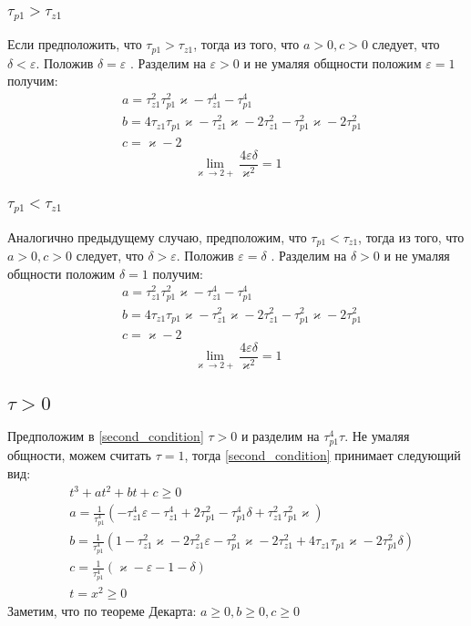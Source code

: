 \documentclass[a4paper]{article}
\begin{document}
\subsubsection{$\tau_{p1} > \tau_{z1}$}
Если предположить, что $\tau_{p1} > \tau_{z1}$, тогда из того, что $a > 0, c > 0$ следует, что $\delta < \varepsilon$. Положив $\delta = \varepsilon$ . Разделим на $\varepsilon > 0$ и не умаляя общности положим $\varepsilon = 1$ получим:
 \begin{equation}
 \begin{aligned}
&a = \tau_{z1}^2\tau_{p1}^2\varkappa - \tau_{z1}^4 - \tau_{p1}^4\\
&b = 4\tau_{z1}\tau_{p1}\varkappa - \tau_{z1}^2\varkappa - 2\tau_{z1}^2 - \tau_{p1}^2\varkappa - 2\tau_{p1}^2\\
&c = \varkappa-2
 \end{aligned}
\end{equation}
$$\lim_{\varkappa \to 2+} \frac{4\varepsilon\delta}{\varkappa^2} = 1$$
\subsubsection{$\tau_{p1} < \tau_{z1}$}
Аналогично предыдущему случаю, предположим, что $\tau_{p1} < \tau_{z1}$, тогда из того, что $a > 0, c > 0$ следует, что $\delta > \varepsilon$. Положив $\varepsilon = \delta$ . Разделим на $\delta > 0$ и не умаляя общности положим $\delta = 1$ получим:
 \begin{equation}
 \begin{aligned}
&a = \tau_{z1}^2\tau_{p1}^2\varkappa - \tau_{z1}^4 - \tau_{p1}^4\\
&b = 4\tau_{z1}\tau_{p1}\varkappa - \tau_{z1}^2\varkappa - 2\tau_{z1}^2 - \tau_{p1}^2\varkappa - 2\tau_{p1}^2\\
&c = \varkappa-2
 \end{aligned}
\end{equation}
$$\lim_{\varkappa \to 2+} \frac{4\varepsilon\delta}{\varkappa^2} = 1$$

\subsection{$\tau > 0$}
Предположим в \eqref{second_condition} $\tau > 0$ и разделим на $\tau_{p1}^4\tau$. Не умаляя общности, можем считать $\tau = 1$, тогда \eqref{second_condition} принимает следующий вид:
 \begin{equation}
 \begin{aligned}
&t^3 +at^2 +bt + c  \geq 0\\
&a = \frac{1}{\tau_{p1}^4}(- \tau_{z1}^4\varepsilon - \tau_{z1}^4 + 2\tau_{p1}^2- \tau_{p1}^4\delta + \tau_{z1}^2\tau_{p1}^2\varkappa)\\
&b = \frac{1}{\tau_{p1}^4}( 1- \tau_{z1}^2\varkappa - 2\tau_{z1}^2\varepsilon - \tau_{p1}^2\varkappa- 2\tau_{z1}^2+ 4\tau_{z1}\tau_{p1}\varkappa- 2\tau_{p1}^2\delta)\\
&c = \frac{1}{\tau_{p1}^4}(\varkappa-\varepsilon - 1 - \delta)\\
&t = x^2 \geq 0
 \end{aligned}
\end{equation}
Заметим, что по теореме Декарта: $a \geq 0, b \geq 0, c \geq 0$
\end{document}
